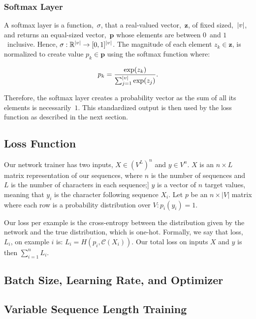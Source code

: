 \documentclass{article}
\DeclarePairedDelimiter\abs{\lvert}{\rvert}%
\begin{document}
\subsubsection{Softmax Layer}

A softmax layer is a function,~$\sigma$, that a real-valued vector,~$\mathbf{z}$, of fixed sized,~$\abs{v}$, and returns an equal-sized vector,~$\mathbf{p}$ whose elements are between $0$~and $1$~inclusive.  Hence, $\sigma : \mathbb{R}^{\abs{v}} \rightarrow [0,1]^{\abs{v}}$.  The magnitude of each element $z_k \in \mathbf{z}$, is normalized to create value $p_k \in \mathbf{p}$ using the softmax function where:

\begin{equation}
  p_k = \frac{\exp(z_k)}{\sum_{j=1}^{\abs{v}} \exp(z_j)}\textrm{.}
\end{equation}

Therefore, the softmax layer creates a probability vector as the sum of all its elements is necessarily~$1$. This standardized output is then used by the loss function as described in the next section.

\subsection{Loss Function}


Our network trainer has two inputs, $X \in (V^L)^n$ and $y \in V^n$. $X$ is an $n \times L$ matrix representation of our sequences, where $n$ is the number of sequences and $L$ is the number of characters in each sequence;] $y$ is a vector of $n$ target values, meaning that $y_i$ is the character following sequence $X_i$. Let $p$ be an $n \times |V|$ matrix where each row is a probability distribution over $V : p_i(y_i) = 1$.

Our loss per example is the cross-entropy between the distribution given by the network and the true distribution, which is one-hot. Formally, we say that loss,~$L_i$, on example $i$ is: $L_i = H(p_i, \mathcal{C}(X_i))$. Our total loss on inputs $X$ and $y$ is then $\sum_{i=1}^{n} L_i$.

\subsection{Batch Size, Learning Rate, and Optimizer}

\subsection{Variable Sequence Length Training}
\end{document}

